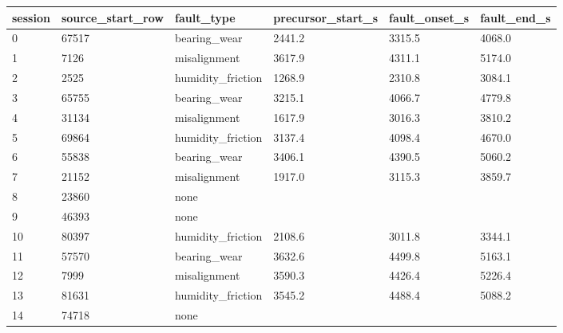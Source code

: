 \begin{tabular}{llllll}
\toprule
session & source\_start\_row & fault\_type & precursor\_start\_s & fault\_onset\_s & fault\_end\_s \\
\midrule
0 & 67517 & bearing\_wear & 2441.2 & 3315.5 & 4068.0 \\
1 & 7126 & misalignment & 3617.9 & 4311.1 & 5174.0 \\
2 & 2525 & humidity\_friction & 1268.9 & 2310.8 & 3084.1 \\
3 & 65755 & bearing\_wear & 3215.1 & 4066.7 & 4779.8 \\
4 & 31134 & misalignment & 1617.9 & 3016.3 & 3810.2 \\
5 & 69864 & humidity\_friction & 3137.4 & 4098.4 & 4670.0 \\
6 & 55838 & bearing\_wear & 3406.1 & 4390.5 & 5060.2 \\
7 & 21152 & misalignment & 1917.0 & 3115.3 & 3859.7 \\
8 & 23860 & none &  &  &  \\
9 & 46393 & none &  &  &  \\
10 & 80397 & humidity\_friction & 2108.6 & 3011.8 & 3344.1 \\
11 & 57570 & bearing\_wear & 3632.6 & 4499.8 & 5163.1 \\
12 & 7999 & misalignment & 3590.3 & 4426.4 & 5226.4 \\
13 & 81631 & humidity\_friction & 3545.2 & 4488.4 & 5088.2 \\
14 & 74718 & none &  &  &  \\
\bottomrule
\end{tabular}
